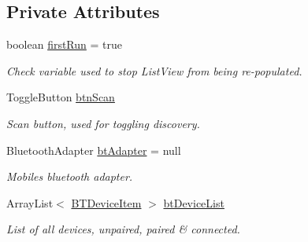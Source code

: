 \subsection*{Private Attributes}
\begin{DoxyCompactItemize}
\item 
\mbox{\label{class_android_app_1_1_pair_device_fragment_aab068c156fe3ef60bcb35328b697ba99}} 
boolean \hyperlink{class_android_app_1_1_pair_device_fragment_aab068c156fe3ef60bcb35328b697ba99}{first\+Run} = true
\begin{DoxyCompactList}\small\item\em Check variable used to stop List\+View from being re-\/populated. \end{DoxyCompactList}\item 
\mbox{\label{class_android_app_1_1_pair_device_fragment_ada62059f31e97361bd94f2828cdc44e1}} 
Toggle\+Button \hyperlink{class_android_app_1_1_pair_device_fragment_ada62059f31e97361bd94f2828cdc44e1}{btn\+Scan}
\begin{DoxyCompactList}\small\item\em Scan button, used for toggling discovery. \end{DoxyCompactList}\item 
\mbox{\label{class_android_app_1_1_pair_device_fragment_a54c71cf078647dbcd55742fc31a0a191}} 
Bluetooth\+Adapter \hyperlink{class_android_app_1_1_pair_device_fragment_a54c71cf078647dbcd55742fc31a0a191}{bt\+Adapter} = null
\begin{DoxyCompactList}\small\item\em Mobile\textquotesingle{}s bluetooth adapter. \end{DoxyCompactList}\item 
\mbox{\label{class_android_app_1_1_pair_device_fragment_ac375aedac2d098332a1af1cf696f50a3}} 
Array\+List$<$ \hyperlink{class_android_app_1_1_b_t_device_item}{B\+T\+Device\+Item} $>$ \hyperlink{class_android_app_1_1_pair_device_fragment_ac375aedac2d098332a1af1cf696f50a3}{bt\+Device\+List}
\begin{DoxyCompactList}\small\item\em List of all devices, unpaired, paired \& connected. \end{DoxyCompactList}\item 

\end{DoxyCompactItemize}
